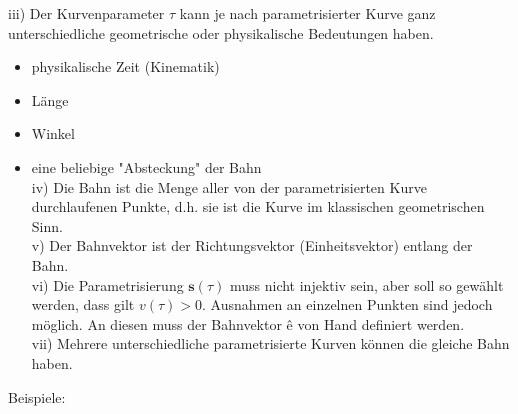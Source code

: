 \documentclass[10pt]{article}
\begin{document}
iii) Der Kurvenparameter $\tau$ kann je nach parametrisierter Kurve ganz unterschiedliche geometrische oder physikalische Bedeutungen haben.

\begin{itemize}
  \item physikalische Zeit (Kinematik)
  \item Länge
  \item Winkel
  \item eine beliebige "Absteckung" der Bahn\\
iv) Die Bahn ist die Menge aller von der parametrisierten Kurve durchlaufenen Punkte, d.h. sie ist die Kurve im klassischen geometrischen Sinn.\\
v) Der Bahnvektor ist der Richtungsvektor (Einheitsvektor) entlang der Bahn.\\
vi) Die Parametrisierung $\mathbf{s}(\tau)$ muss nicht injektiv sein, aber soll so gewählt werden, dass gilt $v(\tau)>0$. Ausnahmen an einzelnen Punkten sind jedoch möglich. An diesen muss der Bahnvektor ê von Hand definiert werden.\\
vii) Mehrere unterschiedliche parametrisierte Kurven können die gleiche Bahn haben.
\end{itemize}

Beispiele:
\end{document}
